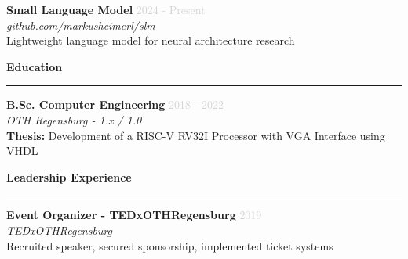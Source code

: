 \documentclass[a4paper,10pt]{article}
\newcommand{\cvsection}[1]{
    \vspace{12pt}
    {\large\bfseries\color{darkgray} #1}
    \vspace{4pt}
    \hrule
    \vspace{8pt}
}
\newcommand{\cventry}[4]{
    \vspace{3pt}
    \textbf{\color{darkgray}#1} \hfill \textcolor{lightgray}{\small #2} \\
    \textcolor{primaryblue}{\textit{\small #3}} \\
    \vspace{3pt}
    {\small #4}
    \vspace{8pt}
}
\begin{document}
\begin{paracol}{2}
\cventry{Small Language Model}{2024 - Present}{\href{https://github.com/markusheimerl/slm}{github.com/markusheimerl/slm}}{
    Lightweight language model for neural architecture research
}

\cvsection{Education}

\cventry{B.Sc. Computer Engineering}{2018 - 2022}{OTH Regensburg - 1.x / 1.0}{
    \textbf{Thesis:} Development of a RISC-V RV32I Processor with VGA Interface using VHDL
}

\cvsection{Leadership Experience}

\textbf{Event Organizer - TEDxOTHRegensburg} \hfill \textcolor{lightgray}{\small 2019} \\
\textcolor{primaryblue}{\textit{\small TEDxOTHRegensburg}} \\
\vspace{3pt}
{\small Recruited speaker, secured sponsorship, implemented ticket systems}

\vspace{0.5cm}

\end{paracol}
\end{document}
